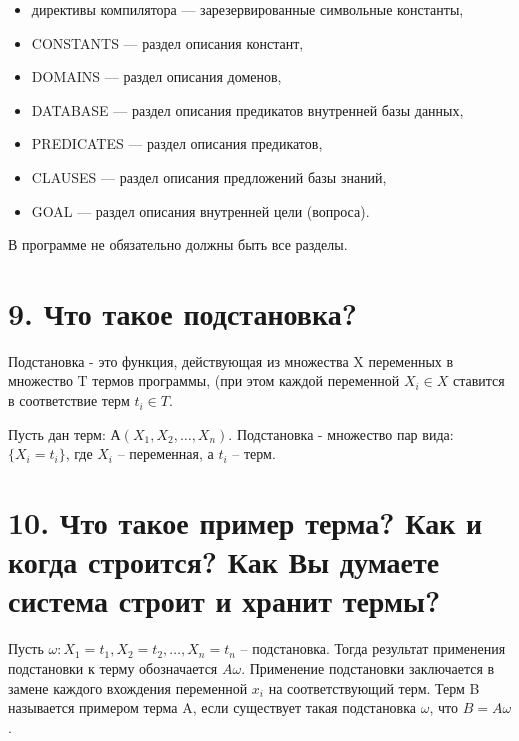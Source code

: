 \documentclass[12pt]{report}
\begin{document}
\begin{itemize}
	\item директивы компилятора — зарезервированные символьные константы,
	\item CONSTANTS — раздел описания констант,
	\item DOMAINS — раздел описания доменов,
	\item DATABASE — раздел описания предикатов внутренней базы данных,
	\item PREDICATES — раздел описания предикатов,
	\item CLAUSES — раздел описания предложений базы знаний,
	\item GOAL — раздел описания внутренней цели (вопроса).
\end{itemize}

В программе не обязательно должны быть все разделы.



















\section*{9. Что такое подстановка?}

Подстановка - это функция, действующая из множества X переменных в множество T термов программы, (при этом каждой переменной $X_{i} \in  X$ ставится в соответствие терм $t_{i} \in  T$.



Пусть дан терм: $А(X_1, X_2,  \dots ,X_n)$.
Подстановка - множество пар вида: $\{X _ i = t _ i\}$, где $X_i$ –   переменная, а $t_i$ –  терм.


\section*{10. Что такое пример терма? Как и когда строится? Как Вы думаете система строит и хранит термы?}


Пусть $\omega: {X}_{1} = {t}_{1} , {X}_{2} = {t}_{2},… , {X}_{n} = {t}_{n}$ -- подстановка. Тогда результат применения подстановки к терму обозначается $A\omega$. Применение подстановки заключается в замене каждого вхождения переменной $x_i$ на соответствующий терм. Терм B называется примером терма A, если существует такая подстановка $\omega$, что $B = A\omega$.
\end{document}
